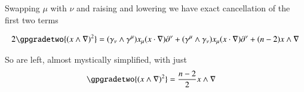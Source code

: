 Swapping $\mu$ with $\nu$ and raising and lowering we have exact cancellation of the first two terms

\begin{align*}
2 \gpgradetwo{(x \wedge \grad)^2 } 
&=
(\gamma_\nu \wedge \gamma^\mu ) x_\mu (x \cdot \grad) \partial^\nu 
+(\gamma^\mu \wedge \gamma_\nu ) x_\mu (x \cdot \grad) \partial^\nu 
+(n-2) x \wedge \grad
\\
\end{align*}

So are left, almost mystically simplified, with just
\begin{align}\label{eqn:qmAngularMom:onGradeTwo2}
\gpgradetwo{(x \wedge \grad)^2 } 
&=
\frac{n-2}{2} x \wedge \grad
\end{align}

\EndNoBibArticle
